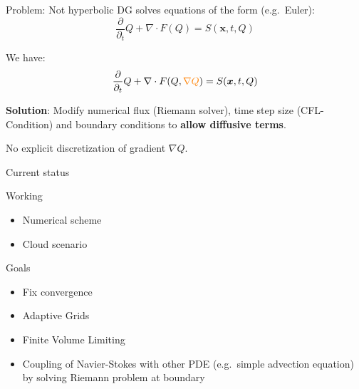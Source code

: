 \documentclass{beamer}
\begin{document}
\begin{frame}{Problem: Not hyperbolic}
  DG solves equations of the form (e.g.\ Euler):
  \begin{equation}
  \label{eq:conservation-law}
 \frac{\partial}{\partial_t}  Q + \nabla \cdot F(Q) = S(\bm{x}, t, Q)
\end{equation}

We have:
\begin{equation}
  \label{eq:conservation-law}
 \frac{\partial}{\partial_t}  Q + \nabla \cdot F(Q, \textcolor{orange}{\nabla Q}) = S(\bm{x}, t, Q)
\end{equation}

\textbf{Solution}:
Modify numerical flux (Riemann solver), time step size (CFL-Condition) and boundary conditions to \textbf{allow diffusive terms}.

\alert{No explicit discretization} of gradient $\nabla Q$.
\end{frame}

\begin{frame}{Current status}
  \begin{block}{Working}
  \begin{itemize}
  \item Numerical scheme
  \item Cloud scenario
  \end{itemize}
  \end{block}

  \begin{block}{Goals}
  \begin{itemize}
  \item Fix convergence
  \item Adaptive Grids
  \item Finite Volume Limiting
  \item Coupling of Navier-Stokes with other PDE (e.g.\ simple advection equation) by solving Riemann problem at boundary
  \end{itemize}
  \end{block}
\end{frame}

\end{document}
